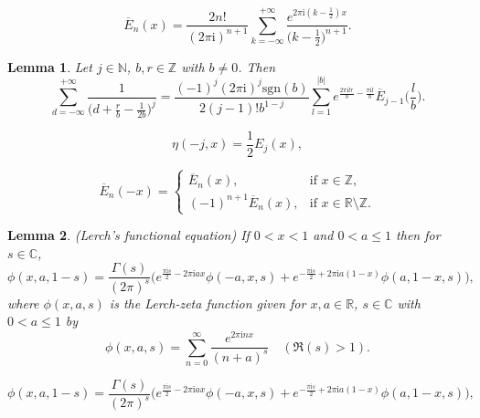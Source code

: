 \documentclass[10pt,a4paper]{amsart}
\newtheorem{lemma}{Lemma}
\begin{document}
\begin{equation}\label{eq2.2}
\overline{E}_{n}(x)=\frac{2n!}{(2\pi\mathrm{i})^{n+1}}\sum_{k=-\infty}^{+\infty}\frac{e^{2\pi\mathrm{i}(k-\frac{1}{2})x}}{\bigl(k-\frac{1}{2}\bigl)^{n+1}}.
\end{equation}

\begin{lemma}\label{lem3.4} Let $j\in\mathbb{N}$, $b,r\in\mathbb{Z}$ with $b\not=0$. Then
\begin{equation}\label{eq3.4}
\sum_{d=-\infty}^{+\infty}\frac{1}{\bigl(d+\frac{r}{b}-\frac{1}{2b}\bigl)^{j}}
=\frac{(-1)^{j}(2\pi\mathrm{i})^{j}\mathrm{sgn}(b)}{2(j-1)!b^{1-j}}\sum_{l=1}^{|b|}e^{\frac{2\pi \mathrm{i}lr}{b}-\frac{\pi \mathrm{i}l}{b}}\overline{E}_{j-1}\biggl(\frac{l}{b}\biggl).
\end{equation}
\end{lemma}

\begin{equation}\label{eq3.7}
\eta(-j,x)=\frac{1}{2}E_{j}(x),
\end{equation}

\begin{equation}\label{eq3.11}
\overline{E}_{n}(-x)=\begin{cases}
\overline{E}_{n}(x),  &\text{if $x\in\mathbb{Z}$},\\
(-1)^{n+1}\overline{E}_{n}(x),  &\text{if $x\in\mathbb{R}\setminus\mathbb{Z}$}.
\end{cases}
\end{equation}

\begin{lemma}\label{lem3.5}(Lerch's functional equation) If $0<x<1$ and $0<a\leq1$ then for $s\in\mathbb{C}$,
\begin{equation}\label{eq3.15}
\phi(x,a,1-s)=\frac{\Gamma(s)}{(2\pi)^{s}}\bigl(e^{\frac{\pi \mathrm{i}s}{2}-2\pi\mathrm{i}ax}\phi(-a,x,s)+e^{-\frac{\pi \mathrm{i}s}{2}+2\pi\mathrm{i}a(1-x)}\phi(a,1-x,s)\bigl),
\end{equation}
where $\phi(x,a,s)$ is the Lerch-zeta function given for $x,a\in\mathbb{R}$, $s\in\mathbb{C}$ with $0<a\leq1$ by
\begin{equation*}
\phi(x,a,s)=\sum_{n=0}^{\infty}\frac{e^{2\pi \mathrm{i}nx}}{(n+a)^{s}}\quad(\Re(s)>1).
\end{equation*}
\end{lemma}

\begin{equation}
\phi(x,a,1-s)=\frac{\Gamma(s)}{(2\pi)^{s}}\bigl(e^{\frac{\pi \mathrm{i}s}{2}-2\pi\mathrm{i}ax}\phi(-a,x,s)+e^{-\frac{\pi \mathrm{i}s}{2}+2\pi\mathrm{i}a(1-x)}\phi(a,1-x,s)\bigl),
\end{equation}
\end{document}
